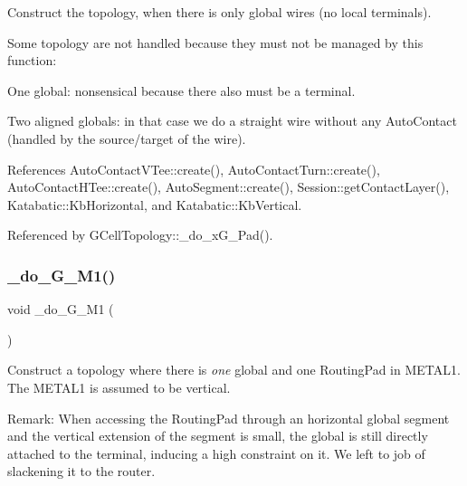 Construct the topology, when there is only global wires (no local terminals).

Some topology are not handled because they must not be managed by this function\+: 
\begin{DoxyItemize}
\item One global\+: nonsensical because there also must be a terminal. 
\item Two aligned globals\+: in that case we do a straight wire without any Auto\+Contact (handled by the source/target of the wire). 
\end{DoxyItemize}

 

References Auto\+Contact\+V\+Tee\+::create(), Auto\+Contact\+Turn\+::create(), Auto\+Contact\+H\+Tee\+::create(), Auto\+Segment\+::create(), Session\+::get\+Contact\+Layer(), Katabatic\+::\+Kb\+Horizontal, and Katabatic\+::\+Kb\+Vertical.



Referenced by G\+Cell\+Topology\+::\+\_\+do\+\_\+x\+G\+\_\+Pad().

\mbox{\label{group__LoadGlobalRouting_gad24a03e87e269f16dcc28d8c2d9f1cfb}} 
\subsubsection{\texorpdfstring{\+\_\+do\+\_\+G\+\_\+M1()}{\_do\_1G\_1M1()}}
{\footnotesize\ttfamily void \+\_\+do\+\_\+G\+\_\+M1 (\begin{DoxyParamCaption}{ }\end{DoxyParamCaption})\hspace{0.3cm}{\ttfamily [private]}}

Construct a topology where there is {\itshape one} global and one Routing\+Pad in {\ttfamily M\+E\+T\+A\+L1}. The {\ttfamily M\+E\+T\+A\+L1} is assumed to be vertical.

\begin{DoxyParagraph}{Remark\+: When accessing the Routing\+Pad through an horizontal global segment}
and the vertical extension of the segment is small, the global is still directly attached to the terminal, inducing a high constraint on it. We left to job of slackening it to the router.
\end{DoxyParagraph}
 

